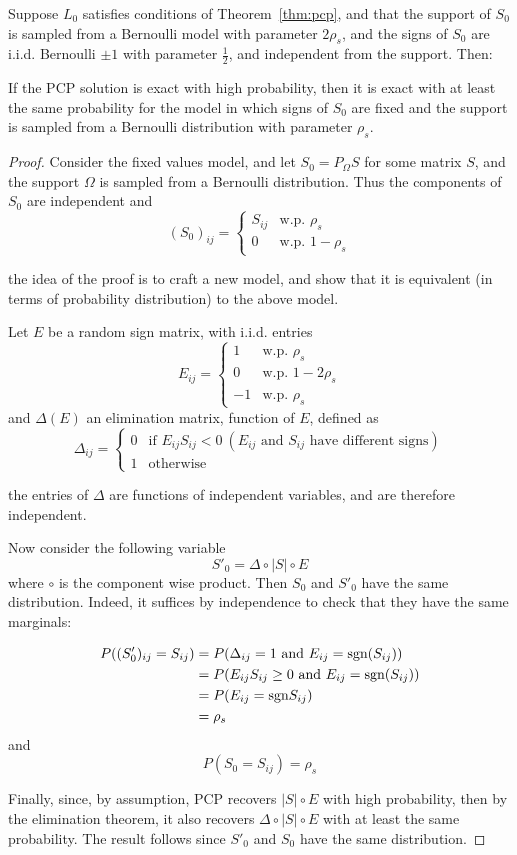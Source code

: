\begin{theorem}
Suppose $L_0$ satisfies conditions of Theorem~\ref{thm:pcp}, and that the support of $S_0$ is sampled from a Bernoulli model with parameter $2\rho_s$, and the signs of $S_0$ are i.i.d. Bernoulli $\pm 1$ with parameter $\frac{1}{2}$, and independent from the support. Then:

If the PCP solution is exact with high probability, then it is exact with at least the same probability for the model in which signs of $S_0$ are fixed and the support is sampled from a Bernoulli distribution with parameter $\rho_s$.
\end{theorem}

\begin{proof}
Consider the fixed values model, and let $S_0 = P_\Omega S$ for some matrix $S$, and the support $\Omega$ is sampled from a Bernoulli distribution. Thus the components of $S_0$ are independent and
\[
(S_0)_{ij} =
\begin{cases}
S_{ij} & \text{w.p. } \rho_s \\
0 & \text{w.p. } 1 - \rho_s
\end{cases}
\]

the idea of the proof is to craft a new model, and show that it is equivalent (in terms of probability distribution) to the above model.

Let $E$ be a random sign matrix, with i.i.d. entries
\[
E_{ij} =
\begin{cases}
1 & \text{w.p. } \rho_s \\
0 & \text{w.p. } 1 - 2\rho_s\\
-1 & \text{w.p. } \rho_s
\end{cases}
\]
and $\Delta(E)$ an elimination matrix, function of $E$, defined as
\[
\Delta_{ij} =
\begin{cases}
0 & \text{if } E_{ij}S_{ij} < 0 \ (E_{ij} \text{ and } S_{ij} \text{ have different signs} )\\
1 & \text{otherwise}
\end{cases}
\]

the entries of $\Delta$ are functions of independent variables, and are therefore independent.

Now consider the following variable
\[
S'_0 = \Delta \circ |S| \circ E
\]
where $\circ$ is the component wise product. Then $S_0$ and $S'_0$ have the same distribution. Indeed, it suffices by independence to check that they have the same marginals:

\begin{align*}
P((S'_0)_{ij} = S_{ij})
&= P(\Delta_{ij} = 1 \text{ and } E_{ij} = \text{sgn}(S_{ij}) ) \\
&= P(E_{ij}S_{ij} \geq 0 \text{ and } E_{ij} = \text{sgn}(S_{ij})) \\
&= P(E_{ij} = \text{sgn} S_{ij}) \\
&= \rho_s
\end{align*}
and
\[
P(S_0 = S_{ij}) = \rho_s
\]

Finally, since, by assumption, PCP recovers $|S| \circ E$ with high probability, then by the elimination theorem, it also recovers $\Delta \circ |S| \circ E$ with at least the same probability. The result follows since $S'_0$ and $S_0$ have the same distribution.
\end{proof}


